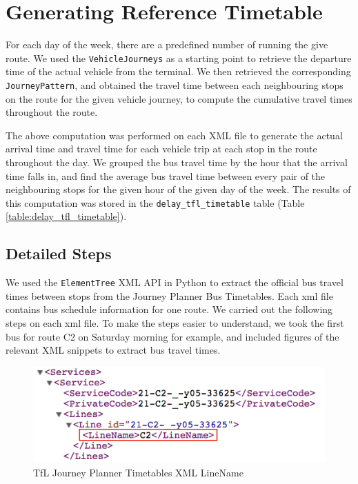 \section{Generating Reference Timetable}
\label{sec: official_tfl_timetable}
For each day of the week, there are a predefined number of running the give route. We used the \texttt{VehicleJourneys} as a starting point to retrieve the departure time of the actual vehicle from the terminal. We then retrieved the corresponding \texttt{JourneyPattern}, and obtained the travel time between each neighbouring stops on the route for the given vehicle journey, to compute the cumulative travel times throughout the route.

The above computation was performed on each XML file to generate the actual arrival time and travel time for each vehicle trip at each stop in the route throughout the day. We grouped the bus travel time by the hour that the arrival time falls in, and find the average bus travel time between every pair of the neighbouring stops for the given hour of the given day of the week. The results of this computation was stored in the \texttt{delay\_tfl\_timetable} table (Table \ref{table:delay_tfl_timetable}).

\subsection{Detailed Steps}

\par We used the \texttt{ElementTree} XML API in Python \cite{elementtree} to extract the official bus travel times between stops from the Journey Planner Bus Timetables\cite{open_data_feeds_description}. Each \acrshort{xml} file contains bus schedule information for one route. We carried out the following steps on each \acrshort{xml} file. To make the steps easier to understand, we took the first bus for route C2 on Saturday morning for example, and included figures of the relevant XML snippets to extract bus travel times.

\begin{figure}
\centering
\includegraphics[width=\textwidth]{figures/xml_linename.png}
\caption{\label{fig:xml_linename} TfL Journey Planner Timetables XML LineName}
\end{figure}

